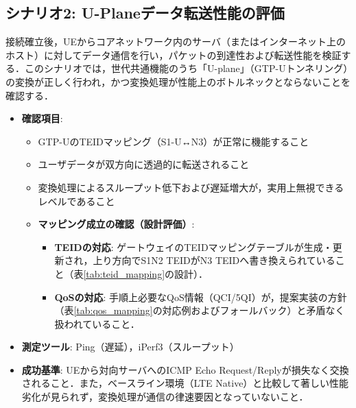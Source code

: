 \subsection{シナリオ2: U-Planeデータ転送性能の評価}
接続確立後，UEからコアネットワーク内のサーバ（またはインターネット上のホスト）に対してデータ通信を行い，パケットの到達性および転送性能を検証する．このシナリオでは，世代共通機能のうち「U-plane」（GTP-Uトンネリング）の変換が正しく行われ，かつ変換処理が性能上のボトルネックとならないことを確認する．
\begin{itemize}
    \item \textbf{確認項目}:
    \begin{itemize}
        \item GTP-UのTEIDマッピング（S1-U↔N3）が正常に機能すること
        \item ユーザデータが双方向に透過的に転送されること
        \item 変換処理によるスループット低下および遅延増大が，実用上無視できるレベルであること
        \item \textbf{マッピング成立の確認（設計評価）}:
        \begin{itemize}
            \item \textbf{TEIDの対応}: ゲートウェイのTEIDマッピングテーブルが生成・更新され，上り方向でS1N2 TEIDがN3 TEIDへ書き換えられていること（表\ref{tab:teid_mapping}の設計）．
            \item \textbf{QoSの対応}: 手順上必要なQoS情報（QCI/5QI）が，提案実装の方針（表\ref{tab:qos_mapping}の対応例およびフォールバック）と矛盾なく扱われていること．
        \end{itemize}
    \end{itemize}
    \item \textbf{測定ツール}: Ping（遅延），iPerf3（スループット）
    \item \textbf{成功基準}: UEから対向サーバへのICMP Echo Request/Replyが損失なく交換されること．また，ベースライン環境（LTE Native）と比較して著しい性能劣化が見られず，変換処理が通信の律速要因となっていないこと．
\end{itemize}
